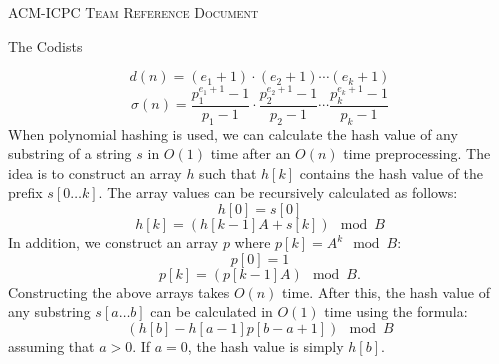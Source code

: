 \documentclass[letterpaper,12pt]{article} %
\begin{document}
  \thispagestyle{fancy}
  
  \begin{center}

    \Huge\textsc{ACM-ICPC Team Reference Document}

    \huge The Codists
    
    \vspace{0.50cm}
  \end{center}
  
  \begin{multicols*}{2}
    \tableofcontents
  \end{multicols*}
  
  \enlargethispage*{\baselineskip}
  \pagebreak
  
  
  \setcounter{page}{1}
  \begin{multicols*}{2}
    
    \[
    d(n) = (e_1 + 1) \cdot (e_2 + 1) \cdots (e_k + 1)
    \]
    \[
    \sigma(n) = \frac{p_1^{e_1+1} - 1}{p_1 - 1} \cdot \frac{p_2^{e_2+1} - 1}{p_2 - 1} \cdots \frac{p_k^{e_k+1} - 1}{p_k - 1}
    \]
    When polynomial hashing is used, we can calculate the hash value of any substring of a string \( s \) in \( O(1) \) time after an \( O(n) \) time preprocessing. The idea is to construct an array \( h \) such that \( h[k] \) contains the hash value of the prefix \( s[0 \dots k] \). The array values can be recursively calculated as follows:
    \[
    h[0] = s[0]
    \]
    \[
    h[k] = (h[k - 1] A + s[k]) \mod B
    \]
    In addition, we construct an array \( p \) where \( p[k] = A^k \mod B \):
    \[
    p[0] = 1
    \]
    \[
    p[k] = (p[k - 1] A) \mod B.
    \]
    Constructing the above arrays takes \( O(n) \) time. After this, the hash value of any substring \( s[a \dots b] \) can be calculated in \( O(1) \) time using the formula:
    \[
    (h[b] - h[a - 1] p[b - a + 1]) \mod B
    \]
    assuming that \( a > 0 \). If \( a = 0 \), the hash value is simply \( h[b] \).
  \end{multicols*}
\end{document}
